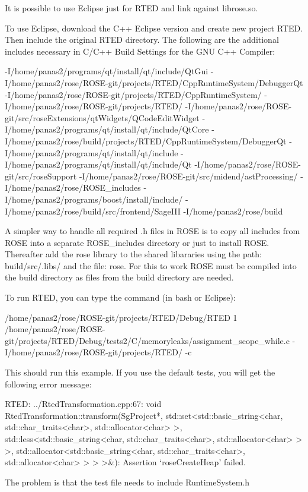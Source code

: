 It is possible to use Eclipse just for RTED and link against librose.so.

To use Eclipse, download the C++ Eclipse version and create new project RTED.
Then include the original RTED directory. The following are the additional includes necessary in C/C++ Build Settings for the GNU C++ Compiler:

-I/home/panas2/programs/qt/install/qt/include/QtGui -I/home/panas2/rose/ROSE-git/projects/RTED/CppRuntimeSystem/DebuggerQt -I/home/panas2/rose/ROSE-git/projects/RTED/CppRuntimeSystem/ -I/home/panas2/rose/ROSE-git/projects/RTED/ -I/home/panas2/rose/ROSE-git/src/roseExtensions/qtWidgets/QCodeEditWidget -I/home/panas2/programs/qt/install/qt/include/QtCore -I/home/panas2/rose/build/projects/RTED/CppRuntimeSystem/DebuggerQt -I/home/panas2/programs/qt/install/qt/include -I/home/panas2/programs/qt/install/qt/include/Qt -I/home/panas2/rose/ROSE-git/src/roseSupport -I/home/panas2/rose/ROSE-git/src/midend/astProcessing/ -I/home/panas2/rose/ROSE_includes -I/home/panas2/programs/boost/install/include/ -I/home/panas2/rose/build/src/frontend/SageIII -I/home/panas2/rose/build 

A simpler way to handle all required .h files in ROSE is to copy all includes from ROSE into a separate ROSE_includes directory or just to install ROSE.
Thereafter add the rose library to the shared libararies using the path: build/src/.libs/ and the file: rose.
For this to work ROSE must be compiled into the build directory as files from the build directory are needed.

To run RTED, you can type the command (in bash or Eclipse):

  /home/panas2/rose/ROSE-git/projects/RTED/Debug/RTED 1  /home/panas2/rose/ROSE-git/projects/RTED/Debug/tests2/C/memoryleaks/assignment_scope_while.c  -I/home/panas2/rose/ROSE-git/projects/RTED/ -c

This should run this example. If you use the default tests, you will get the following error message: 

  RTED: ../RtedTransformation.cpp:67: void RtedTransformation::transform(SgProject*,
  std::set<std::basic_string<char, std::char_traits<char>, std::allocator<char> >, 
  std::less<std::basic_string<char, std::char_traits<char>, std::allocator<char> > >, 
  std::allocator<std::basic_string<char, std::char_traits<char>, std::allocator<char> > 
  > >&): Assertion `roseCreateHeap' failed.

The problem is that the test file needs to include RuntimeSystem.h

